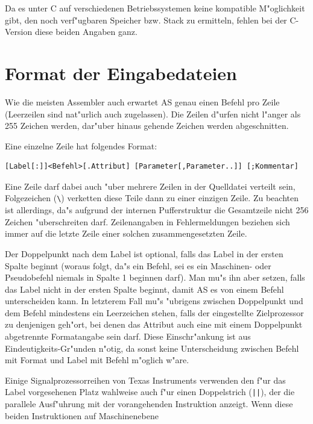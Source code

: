 \documentclass[12pt,a4paper,twoside]{report}
\newcommand{\asname}{AS}
\begin{document}
Da es unter C   auf verschiedenen Betriebssystemen
keine kompatible M"oglichkeit gibt, den noch verf"ugbaren Speicher bzw.
Stack zu ermitteln, fehlen bei der C-Version diese beiden Angaben ganz.


\section{Format der Eingabedateien}
\label{AttrTypes}

Wie die meisten Assembler auch erwartet \asname{} genau einen Befehl pro Zeile
(Leerzeilen sind nat"urlich auch zugelassen).  Die Zeilen d"urfen nicht
l"anger als 255 Zeichen werden, dar"uber hinaus gehende Zeichen werden
abgeschnitten.
\par
Eine einzelne Zeile hat folgendes Format:
\begin{verbatim}
[Label[:]]<Befehl>[.Attribut] [Parameter[,Parameter..]] [;Kommentar]
\end{verbatim}
Eine Zeile darf dabei auch "uber mehrere Zeilen in der Quelldatei
verteilt sein, Folgezeichen (\verb!\!) verketten diese Teile dann zu
einer einzigen Zeile.  Zu beachten ist allerdings, da"s aufgrund der
internen Pufferstruktur die Gesamtzeile nicht 256 Zeichen "uberschreiten
darf.  Zeilenangaben in Fehlermeldungen beziehen sich immer auf die
letzte Zeile einer solchen zusammengesetzten Zeile.
\par
Der Doppelpunkt nach dem Label ist optional, falls das Label in der
ersten Spalte beginnt (woraus folgt, da"s ein Befehl, sei es ein
Maschinen- oder Pseudobefehl niemals in Spalte 1 beginnen darf).
Man mu"s ihn aber setzen, falls das Label nicht in der ersten Spalte
beginnt, damit \asname{} es von einem Befehl unterscheiden kann.  In letzterem
Fall mu"s "ubrigens zwischen Doppelpunkt und dem Befehl mindestens ein
Leerzeichen stehen, falls der eingestellte Zielprozessor zu denjenigen
geh"ort, bei denen das Attribut auch eine mit einem Doppelpunkt
abgetrennte Formatangabe sein darf.  Diese Einschr"ankung ist aus
Eindeutigkeits-Gr"unden n"otig, da sonst keine Unterscheidung zwischen
Befehl mit Format und Label mit Befehl m"oglich w"are.
\par
Einige Signalprozessorreihen von Texas Instruments verwenden den f"ur das
Label vorgesehenen Platz wahlweise auch f"ur einen Doppelstrich
(\verb!||!), der die parallele Ausf"uhrung mit der vorangehenden
Instruktion anzeigt.  Wenn diese beiden Instruktionen auf Maschinenebene
\end{document}
